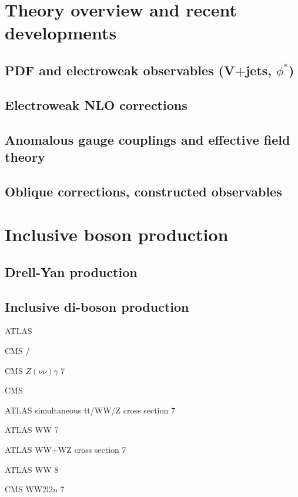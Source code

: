 \documentclass[12pt]{iopart}
\begin{document}
\section{Theory overview and recent developments}
\label{s-theory-overview}
\subsection{PDF and electroweak observables (V+jets, $\phi^*$)}
\subsection{Electroweak NLO corrections}
\subsection{Anomalous gauge couplings and effective field theory}
\subsection{Oblique corrections, constructed observables}


\section{Inclusive boson production}
\label{s-inclboson}
\subsection{Drell-Yan production}
\label{ss-inclboson-drellyan}

\subsection{Inclusive di-boson production}

ATLAS \Wg {} \TeV\xspace~\cite{Aad:2013izg}

CMS \Wg/ \TeV\xspace~\cite{Chatrchyan:2013fya}

CMS $Z(\nu\bar{\nu})\gamma$ 7 \TeV~\cite{Chatrchyan:2013nda}

CMS  \TeV~\cite{Khachatryan:2015kea}


ATLAS simultaneous tt/WW/Z cross section 7 \TeV~\cite{Aad:2014jra}

ATLAS WW 7 \TeV~\cite{ATLAS:2012mec}

ATLAS WW+WZ cross section 7 \TeV~\cite{Aad:2014mda}

ATLAS WW 8 \TeV~\cite{ATLAS-CONF-2014-033}

CMS WW2l2n 7 \TeV~\cite{Chatrchyan:2013yaa}
\end{document}
